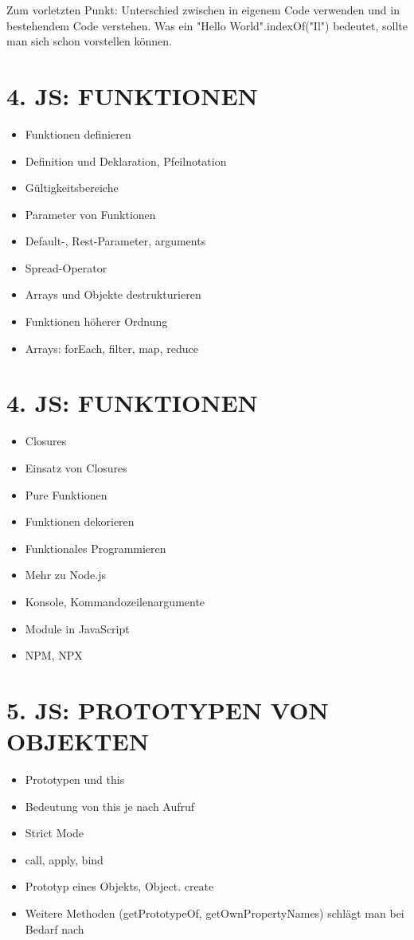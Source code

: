 \documentclass[10pt]{article}
\begin{document}
Zum vorletzten Punkt: Unterschied zwischen in eigenem Code verwenden und in bestehendem Code verstehen. Was ein "Hello World".indexOf("Il") bedeutet, sollte man sich schon vorstellen können.

\section*{4. JS: FUNKTIONEN}
\begin{itemize}
  \item Funktionen definieren
  \item Definition und Deklaration, Pfeilnotation
  \item Gültigkeitsbereiche
  \item Parameter von Funktionen
  \item Default-, Rest-Parameter, arguments
  \item Spread-Operator
  \item Arrays und Objekte destrukturieren
  \item Funktionen höherer Ordnung
  \item Arrays: forEach, filter, map, reduce
\end{itemize}

\section*{4. JS: FUNKTIONEN}
\begin{itemize}
  \item Closures
  \item Einsatz von Closures
  \item Pure Funktionen
  \item Funktionen dekorieren
  \item Funktionales Programmieren
  \item Mehr zu Node.js
  \item Konsole, Kommandozeilenargumente
  \item Module in JavaScript
  \item NPM, NPX
\end{itemize}

\section*{5. JS: PROTOTYPEN VON OBJEKTEN}
\begin{itemize}
  \item Prototypen und this
  \item Bedeutung von this je nach Aufruf
  \item Strict Mode
  \item call, apply, bind
  \item Prototyp eines Objekts, Object. create
  \item Weitere Methoden (getPrototypeOf, getOwnPropertyNames) schlägt man bei Bedarf nach
\end{itemize}
\end{document}
